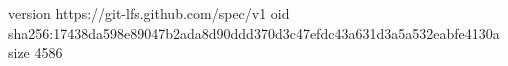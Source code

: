 version https://git-lfs.github.com/spec/v1
oid sha256:17438da598e89047b2ada8d90ddd370d3c47efdc43a631d3a5a532eabfe4130a
size 4586

